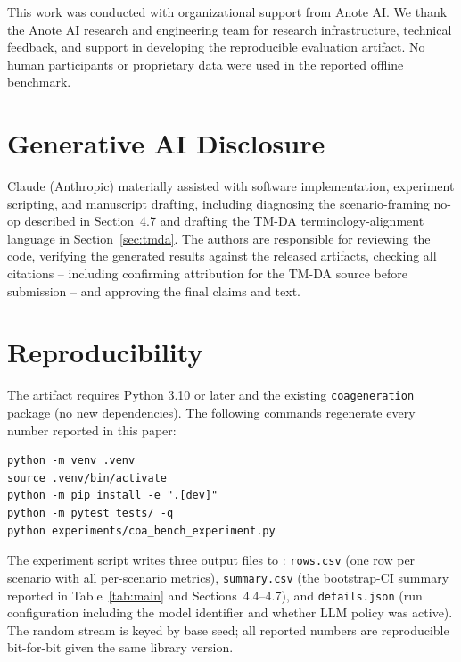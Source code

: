 \documentclass[sigconf]{acmart}
\begin{document}
\begin{acks}
This work was conducted with organizational support from Anote AI. We thank the Anote AI research and engineering team for research infrastructure, technical feedback, and support in developing the reproducible evaluation artifact. No human participants or proprietary data were used in the reported offline benchmark.
\end{acks}

\section*{Generative AI Disclosure}
Claude (Anthropic) materially assisted with software implementation, experiment scripting, and manuscript drafting, including diagnosing the scenario-framing no-op described in Section~4.7 and drafting the TM-DA terminology-alignment language in Section~\ref{sec:tmda}. The authors are responsible for reviewing the code, verifying the generated results against the released artifacts, checking all citations -- including confirming attribution for the TM-DA source before submission -- and approving the final claims and text.




\appendix

\section{Reproducibility}

The artifact requires Python 3.10 or later and the existing \texttt{coageneration} package (no new dependencies). The following commands regenerate every number reported in this paper:

\begin{verbatim}
python -m venv .venv
source .venv/bin/activate
python -m pip install -e ".[dev]"
python -m pytest tests/ -q
python experiments/coa_bench_experiment.py
\end{verbatim}

The experiment script writes three output files to : \texttt{rows.csv} (one row per scenario with all per-scenario metrics), \texttt{summary.csv} (the bootstrap-CI summary reported in Table~\ref{tab:main} and Sections~4.4--4.7), and \texttt{details.json} (run configuration including the model identifier and whether LLM policy was active). The random stream is keyed by base seed; all reported numbers are reproducible bit-for-bit given the same library version.
\end{document}
